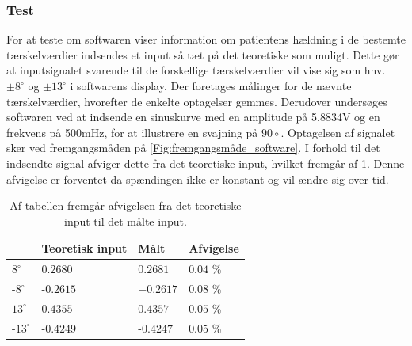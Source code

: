 \subsubsection{Test}
For at teste om softwaren viser information om patientens hældning i de bestemte tærskelværdier indsendes et input så tæt på det teoretiske som muligt. Dette gør at inputsignalet svarende til de forskellige tærskelværdier vil vise sig som hhv. $\pm 8^{\circ}$ og $\pm 13^{\circ}$ i softwarens display. Der foretages målinger for de nævnte tærskelværdier, hvorefter de enkelte optagelser gemmes.
Derudover undersøges softwaren ved at indsende en sinuskurve med en amplitude på 5.8834V og en frekvens på 500mHz, for at illustrere en svajning på \pm $90{\circ}$. Optagelsen af signalet sker ved fremgangsmåden på \ref{Fig:fremgangsmåde_software}. I forhold til det indsendte signal afviger dette fra det teoretiske input, hvilket fremgår af \ref{Tab:afvigelse_software}. Denne afvigelse er forventet da spændingen ikke er konstant og vil ændre sig over tid. 

\begin{table}[]
\centering
\caption{Af tabellen fremgår afvigelsen fra det teoretiske input til det målte input.}
\label{Tab:afvigelse_software}
\begin{tabular}{llll}
             & Teoretisk input & Målt 	& Afvigelse \\ \hline
$8^{\circ}$   & $0.2680$          & $0.2681$  & $0.04$ \% \\ \hline
-$8^{\circ}$   & -$0.2615$         & $-0.2617$ & $0.08$ \%  \\ \hline
$13^{\circ}$  & $0.4355$          & $0.4357$  & $0.05$ \% \\ \hline
-$13^{\circ}$ & -$0.4249$         & -$0.4247$ & $0.05$ \% \\ \hline    
\end{tabular}
\end{table}

